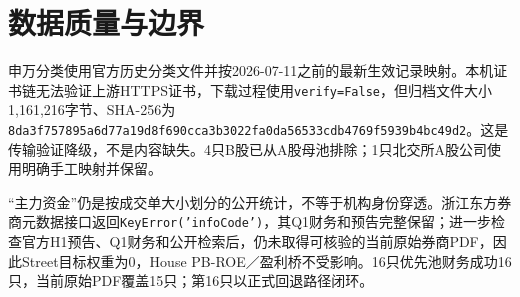 \section{数据质量与边界}

申万分类使用官方历史分类文件并按2026-07-11之前的最新生效记录映射。本机证书链无法验证上游HTTPS证书，下载过程使用\texttt{verify=False}，但归档文件大小1,161,216字节、SHA-256为\texttt{8da3f757}\allowbreak\texttt{895a6d77}\allowbreak\texttt{a19d8f69}\allowbreak\texttt{0cca3b30}\allowbreak\texttt{22fa0da5}\allowbreak\texttt{6533cdb4}\allowbreak\texttt{769f5939}\allowbreak\texttt{b4bc49d2}。这是传输验证降级，不是内容缺失。4只B股已从A股母池排除；1只北交所A股公司使用明确手工映射并保留。

“主力资金”仍是按成交单大小划分的公开统计，不等于机构身份穿透。浙江东方券商元数据接口返回\texttt{KeyError('infoCode')}，其Q1财务和预告完整保留；进一步检查官方H1预告、Q1财务和公开检索后，仍未取得可核验的当前原始券商PDF，因此Street目标权重为0，House PB-ROE／盈利桥不受影响。16只优先池财务成功16只，当前原始PDF覆盖15只；第16只以正式回退路径闭环。
